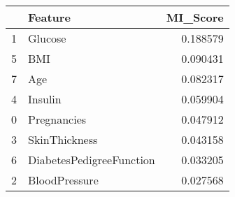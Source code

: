 \begin{tabular}{llr}
\toprule
 & Feature & MI_Score \\
\midrule
1 & Glucose & 0.188579 \\
5 & BMI & 0.090431 \\
7 & Age & 0.082317 \\
4 & Insulin & 0.059904 \\
0 & Pregnancies & 0.047912 \\
3 & SkinThickness & 0.043158 \\
6 & DiabetesPedigreeFunction & 0.033205 \\
2 & BloodPressure & 0.027568 \\
\bottomrule
\end{tabular}
